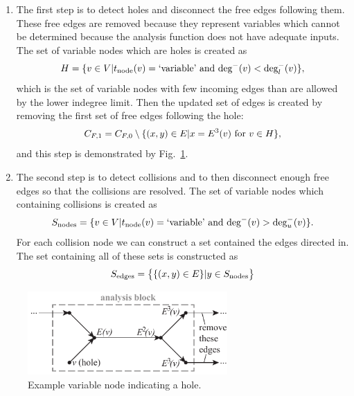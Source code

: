 \begin{enumerate}
\item The first step is to detect holes and disconnect the free edges following them. These free edges are removed because they represent variables which cannot be determined because the analysis function does not have adequate inputs. The set of variable nodes which are holes is created as
\begin{equation}
H = \{v \in V | t_\textrm{node}(v) = \textrm{`variable'} \textrm{ and } \textrm{deg}^-(v) < \textrm{deg}_l^-(v) \},
\end{equation}
which is the set of variable nodes with few incoming edges than are allowed by the lower indegree limit.
Then the updated set of edges is created by removing the first set of free edges following the hole:
\begin{equation}
C_{F,1} = C_{F,0} \setminus \{(x,y) \in E | x=E^3(v) \textrm{ for } v \in H\},
\end{equation}
and this step is demonstrated by Fig.~\ref{f:holes}.
\item The second step is to detect collisions and to then disconnect enough free edges so that the collisions are resolved. The set of variable nodes which containing collisions is created as
\begin{equation}
S_\textrm{nodes} = \{v \in V | t_\textrm{node}(v) = \textrm{`variable'} \textrm{ and } \textrm{deg}^-(v) > \textrm{deg}_u^-(v) \}.
\end{equation}
For each collision node we can construct a set contained the edges directed in. The set containing all of these sets is constructed as
\begin{equation}
S_\textrm{edges} = \big \{ \{(x,y) \in E\} | y \in S_\textrm{nodes} \big \}
\end{equation}

\end{enumerate}
\begin{figure}[htb!]
	\begin{center}
	\includegraphics[width=3in]{images/analysis_block_hole}
	\end{center}
	\vspace{-20pt}
\caption{Example variable node indicating a hole.}
\label{f:holes}
\end{figure}


